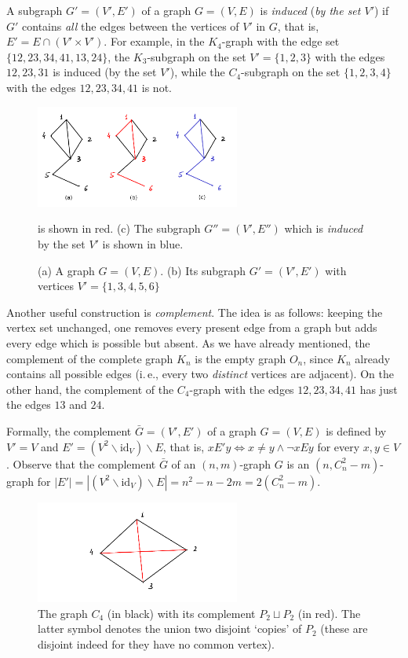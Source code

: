 \documentclass[12pt,notitlepage]{article}
\theoremstyle{plain}
\theoremstyle{definition}
\theoremstyle{plain}
\renewcommand{\setminus}{\smallsetminus}
\newcommand{\id}{\mathrm{id}}
\newcommand{\1}{\mathbf{1}}
\newcommand{\0}{\mathbf{0}}
\begin{document}
A subgraph $G' = (V', E')$ of a graph $G = (V, E)$ is \emph{induced} (\emph{by the set $V'$}) if $G'$ contains \emph{all} the edges between the vertices of $V'$ in $G$, that is, $E' = E \cap (V' \times V')$. For example, in the $K_4$-graph with the edge set $\{12, 23, 34, 41, 13, 24\}$, the $K_3$-subgraph on the set $V' = \{1,2,3\}$ with the edges $12, 23, 31$ is induced (by the set $V'$), while the $C_4$-subgraph on the set $\{1,2,3,4\}$ with the edges $12, 23, 34, 41$ is not.

\begin{figure}[h]
\centering
\includegraphics*[width=0.6\textwidth]{graph_sub.pdf}
\caption{(a) A graph $G = (V, E)$. (b) Its subgraph $G' = (V', E')$ with vertices $V' = \{1, 3, 4, 5, 6\}$} is shown in red. (c) The subgraph $G'' = (V', E'')$ which is \emph{induced} by the set $V'$ is shown in blue.
\end{figure}

Another useful construction is \emph{complement}. The idea is as follows: keeping the vertex set unchanged, one removes every present edge from a graph but adds every edge which is possible but absent. As we have already mentioned, the complement of the complete graph $K_n$ is the empty graph $O_n$, since $K_n$ already contains all possible edges (i.\,e., every two \emph{distinct} vertices are adjacent). On the other hand, the complement of the $C_4$-graph with the edges $12, 23, 34, 41$ has just the edges $13$ and $24$.

Formally, the complement $\bar G = (V', E')$ of a graph $G = (V, E)$ is defined by $V' = V$ and $E' = (V^2 \setminus \id_{V}) \setminus E$, that is, $x E' y \iff x \neq y \wedge \neg x E y$ for every $x, y \in V$. Observe that the complement $\bar G$ of an $(n, m)$-graph $G$ is an $(n, C_n^2 - m)$-graph for $|E'| = |(V^2 \setminus \id_{V}) \setminus E| = n^2 - n - 2m = 2(C_n^2 - m)$.

\begin{figure}[h]
\centering
\includegraphics*[width=0.6\textwidth]{graph_compl.pdf}
\caption{The graph $C_4$ (in black) with its complement $P_2 \sqcup P_2$ (in red). The latter symbol denotes the union two disjoint `copies' of $P_2$ (these are disjoint indeed for they have no common vertex).}
\end{figure}
\end{document}
